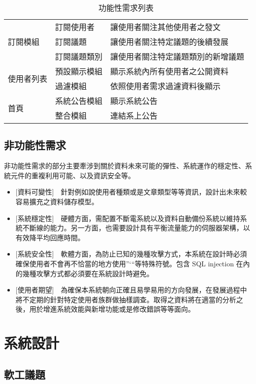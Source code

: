 \documentclass[11pt]{article}
\begin{document}
\begin{table}[t]
\begin{tabular}{ | l | l | l | }
\multirow{3}{*}{訂閱模組}
& 訂閱使用者 & 讓使用者關注其他使用者之發文 \\
& 訂閱議題 & 讓使用者關注特定議題的後續發展 \\
& 訂閱議題類別 & 讓使用者關注特定議題類別的新增議題 \\ \hline
\multirow{2}{*}{使用者列表}
& 預設顯示模組 & 顯示系統內所有使用者之公開資料 \\
& 過濾模組 & 依照使用者需求過濾資料後顯示 \\ \hline
\multirow{2}{*}{首頁}
& 系統公告模組 & 顯示系統公告 \\
& 整合模組 & 連結系上公告 \\ \hline
\end{tabular}
\caption{功能性需求列表}
\label{req}
\end{table}

\subsection{非功能性需求}
非功能性需求的部分主要牽涉到關於資料未來可能的彈性、系統運作的穩定性、系統元件的重複利用可能、以及資訊安全等。
\begin{itemize}
\item{[資料可變性]~~針對例如說使用者種類或是文章類型等等資訊，設計出未來較容易擴充之資料儲存模型。 }
\item{[系統穩定性]~~硬體方面，需配置不斷電系統以及資料自動備份系統以維持系統不斷線的能力。另一方面，也需要設計具有平衡流量能力的伺服器架構，以有效降平均回應時間。}
\item{[系統安全性]~~軟體方面，為防止已知的幾種攻擊方式，本系統在設計時必須確保使用者不會再不恰當的地方使用”‘“等特殊符號。包含 SQL injection 在內的幾種攻擊方式都必須要在系統設計時避免。}
\item{[使用者期望]~~為確保本系統朝向正確且易學易用的方向發展，在發展過程中將不定期的針對特定使用者族群做抽樣調查。取得之資料將在適當的分析之後，用於增進系統效能與新增功能或是修改錯誤等等面向。}
\end{itemize}

\section{系統設計}





\subsection{軟工議題}
\end{document}
